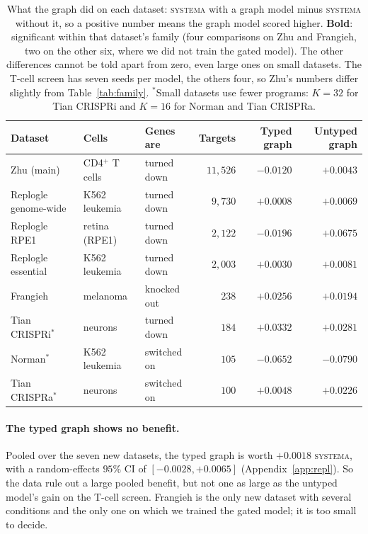 \documentclass{article}
\begin{document}
\begin{table}[t]
\centering
\caption{What the graph did on each dataset: \textsc{systema} with a graph model minus \textsc{systema}
without it, so a positive number means the graph model scored higher. \textbf{Bold}: significant within
that dataset's family (four comparisons on Zhu and Frangieh, two on the other six, where we did not train
the gated model). The other differences cannot be told apart from zero, even large ones on small
datasets. The T-cell screen has seven seeds per model, the others four, so Zhu's numbers differ slightly from
Table~\ref{tab:family}. $^{*}$Small datasets use fewer programs: $K{=}32$ for Tian CRISPRi and $K{=}16$
for Norman and Tian CRISPRa.}
\label{tab:repl}
\vspace{2pt}
{\small
\begin{tabular}{@{}lllrrr@{}}
\toprule
Dataset & Cells & Genes are & Targets & Typed graph & Untyped graph \\
\midrule
Zhu (main) & CD4$^{+}$ T cells & turned down & $11{,}526$ & $\mathbf{-0.0120}$ & $\mathbf{+0.0043}$ \\
Replogle genome-wide & K562 leukemia & turned down & $9{,}730$ & $+0.0008$ & $+0.0069$ \\
Replogle RPE1 & retina (RPE1) & turned down & $2{,}122$ & $-0.0196$ & $\mathbf{+0.0675}$ \\
Replogle essential & K562 leukemia & turned down & $2{,}003$ & $+0.0030$ & $+0.0081$ \\
Frangieh & melanoma & knocked out & $238$ & $+0.0256$ & $+0.0194$ \\
Tian CRISPRi$^{*}$ & neurons & turned down & $184$ & $+0.0332$ & $+0.0281$ \\
Norman$^{*}$ & K562 leukemia & switched on & $105$ & $-0.0652$ & $\mathbf{-0.0790}$ \\
Tian CRISPRa$^{*}$ & neurons & switched on & $100$ & $+0.0048$ & $+0.0226$ \\
\bottomrule
\end{tabular}}
\end{table}

\paragraph{The typed graph shows no benefit.} Pooled over the seven new datasets, the typed graph is worth
$+0.0018$ \textsc{systema}, with a random-effects $95\%$ CI of $[-0.0028,+0.0065]$ (Appendix~\ref{app:repl}).
So the data rule out a large pooled benefit, but not one as large as the untyped model's gain on the
T-cell screen. Frangieh is the only new dataset with several conditions and the only one on which we trained
the gated model; it is too small to decide.
\end{document}
